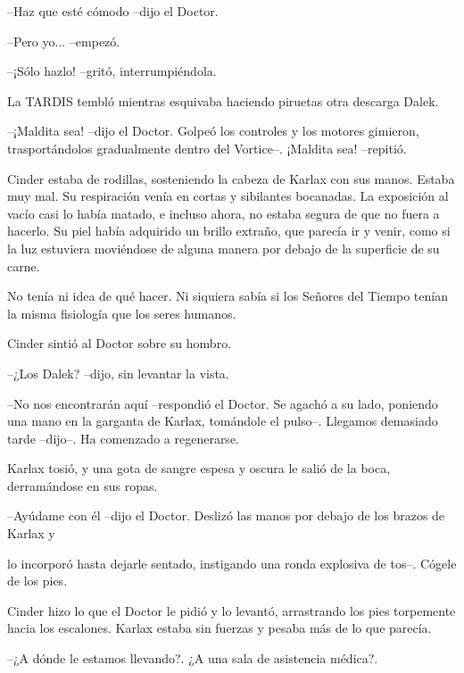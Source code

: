--Haz que esté cómodo --dijo el Doctor.

--Pero yo... --empezó.

--¡Sólo hazlo! --gritó, interrumpiéndola.



La TARDIS tembló mientras esquivaba haciendo piruetas otra descarga Dalek. 



--¡Maldita sea! --dijo el Doctor. Golpeó los controles y los motores gimieron, trasportándolos gradualmente dentro del Vortice--. ¡Maldita sea! --repitió.



Cinder estaba de rodillas, sosteniendo la cabeza de Karlax con sus manos. Estaba muy mal. Su respiración venía en cortas y sibilantes bocanadas. La exposición al vacío casi lo había matado, e incluso ahora, no estaba segura de que no fuera a hacerlo. Su piel había adquirido un brillo extraño, que parecía ir y venir, como si la luz estuviera moviéndose de alguna manera por debajo de la superficie de su carne.

No tenía ni idea de qué hacer. Ni siquiera sabía si los Señores del Tiempo tenían la misma fisiología que los seres humanos.

Cinder sintió al Doctor sobre su hombro. 



--¿Los Dalek? --dijo, sin levantar la vista.

--No nos encontrarán aquí --respondió el Doctor. Se agachó a su lado, poniendo una mano en la garganta de Karlax, tomándole el pulso--. Llegamos demasiado tarde --dijo--. Ha comenzado a regenerarse.



Karlax tosió, y una gota de sangre espesa y oscura le salió de la boca, derramándose en sus ropas.



--Ayúdame con él --dijo el Doctor. Deslizó las manos por debajo de los brazos de Karlax y 

lo incorporó hasta dejarle sentado, instigando una ronda explosiva de tos--. Cógele de los pies.



Cinder hizo lo que el Doctor le pidió y lo levantó, arrastrando los pies torpemente hacia los escalones. Karlax estaba sin fuerzas y pesaba más de lo que parecía. 



--¿A dónde le estamos llevando?. ¿A una sala de asistencia médica?.

